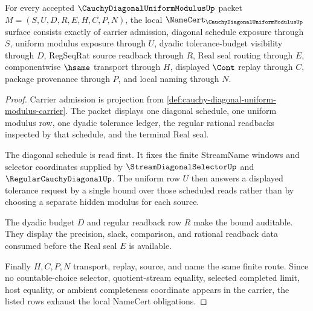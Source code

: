 \begin{theorem}
\label{thm:cauchy-diagonal-uniform-modulus-namecert-obligations}
For every accepted $\CauchyDiagonalUniformModulusUp$ packet $M=(S,U,D,R,E,H,C,P,N)$, the local $\NameCert_{\CauchyDiagonalUniformModulusUp}$ surface consists exactly of carrier admission, diagonal schedule exposure through $S$, uniform modulus exposure through $U$, dyadic tolerance-budget visibility through $D$, RegSeqRat source readback through $R$, Real seal routing through $E$, componentwise $\hsame$ transport through $H$, displayed $\Cont$ replay through $C$, package provenance through $P$, and local naming through $N$.
\end{theorem}
\begin{proof}
Carrier admission is projection from \autoref{def:cauchy-diagonal-uniform-modulus-carrier}. The packet displays one diagonal schedule, one uniform modulus row, one dyadic tolerance ledger, the regular rational readbacks inspected by that schedule, and the terminal Real seal.

The diagonal schedule is read first. It fixes the finite StreamName windows and selector coordinates supplied by $\StreamDiagonalSelectorUp$ and $\RegularCauchyDiagonalUp$. The uniform row $U$ then answers a displayed tolerance request by a single bound over those scheduled reads rather than by choosing a separate hidden modulus for each source.

The dyadic budget $D$ and regular readback row $R$ make the bound auditable. They display the precision, slack, comparison, and rational readback data consumed before the Real seal $E$ is available.

Finally $H,C,P,N$ transport, replay, source, and name the same finite route. Since no countable-choice selector, quotient-stream equality, selected completed limit, host equality, or ambient completeness coordinate appears in the carrier, the listed rows exhaust the local NameCert obligations.
\end{proof}



